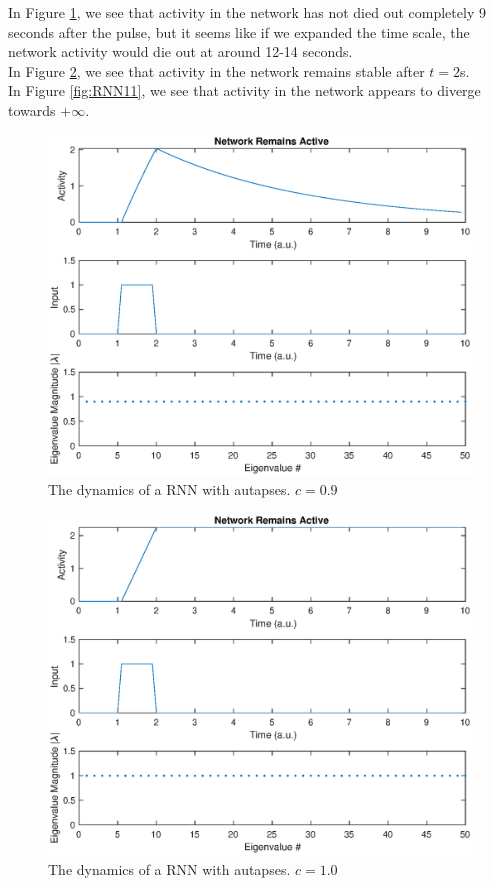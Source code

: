 \documentclass[11pt, oneside]{article}
\begin{document}
In Figure \ref{fig:RNN09}, we see that activity in the network has not died out completely 9 seconds after the pulse, but it seems like if we expanded the time scale, the network activity would die out at around 12-14 seconds. \\
In Figure \ref{fig:RNN10}, we see that activity in the network remains stable after $t = 2$s.\\
In Figure \ref{fig:RNN11}, we see that activity in the network appears to diverge towards $+\infty$.

\begin{figure}[H]
\includegraphics[width=1\textwidth]{RNN09.eps}
\caption{The dynamics of a RNN with autapses. $c = 0.9$}
\label{fig:RNN09}
\end{figure}

\begin{figure}[H]
\includegraphics[width=1\textwidth]{RNN10.eps}
\caption{The dynamics of a RNN with autapses. $c = 1.0$}
\label{fig:RNN10}
\end{figure}
\end{document}
